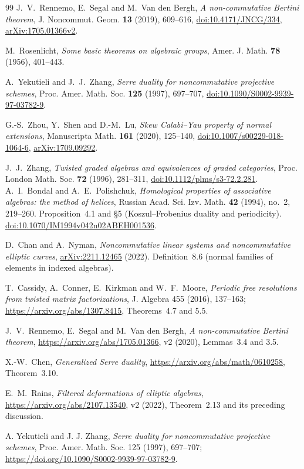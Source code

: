 \documentclass[11pt,a4paper]{ltjsarticle}
\numberwithin{equation}{section}
\begin{document}
\begin{thebibliography}{99}
J.~V.~Rennemo, E.~Segal and M.~Van den Bergh,
\textit{A non-commutative Bertini theorem},
J. Noncommut. Geom. \textbf{13} (2019), 609--616,
\href{https://doi.org/10.4171/JNCG/334}{doi:10.4171/JNCG/334},
\href{https://arxiv.org/abs/1705.01366}{arXiv:1705.01366v2}.

M.~Rosenlicht,
\textit{Some basic theorems on algebraic groups},
Amer. J. Math. \textbf{78} (1956), 401--443.

A.~Yekutieli and J.~J.~Zhang,
\textit{Serre duality for noncommutative projective schemes},
Proc. Amer. Math. Soc. \textbf{125} (1997), 697--707,
\href{https://doi.org/10.1090/S0002-9939-97-03782-9}{doi:10.1090/S0002-9939-97-03782-9}.

G.-S.~Zhou, Y.~Shen and D.-M.~Lu,
\textit{Skew Calabi--Yau property of normal extensions},
Manuscripta Math. \textbf{161} (2020), 125--140,
\href{https://doi.org/10.1007/s00229-018-1064-6}{doi:10.1007/s00229-018-1064-6},
\href{https://arxiv.org/abs/1709.09292}{arXiv:1709.09292}.

J.~J.~Zhang,
\textit{Twisted graded algebras and equivalences of graded categories},
Proc. London Math. Soc. \textbf{72} (1996), 281--311,
\href{https://doi.org/10.1112/plms/s3-72.2.281}{doi:10.1112/plms/s3-72.2.281}.
A.~I.~Bondal and A.~E.~Polishchuk,
\emph{Homological properties of associative algebras: the method of helices},
Russian Acad. Sci. Izv. Math. \textbf{42} (1994), no.~2, 219--260.
Proposition~4.1 and \S5 (Koszul--Frobenius duality and periodicity).
\href{https://doi.org/10.1070/IM1994v042n02ABEH001536}
{doi:10.1070/IM1994v042n02ABEH001536}.

D.~Chan and A.~Nyman,
\emph{Noncommutative linear systems and noncommutative elliptic curves},
\href{https://arxiv.org/abs/2211.12465}{arXiv:2211.12465} (2022).
Definition~8.6 (normal families of elements in indexed algebras).

T.~Cassidy, A.~Conner, E.~Kirkman and W.~F.~Moore,
\emph{Periodic free resolutions from twisted matrix factorizations},
J. Algebra 455 (2016), 137--163;
\url{https://arxiv.org/abs/1307.8415}, Theorems~4.7 and 5.5.

J.~V.~Rennemo, E.~Segal and M.~Van den Bergh,
\emph{A non-commutative Bertini theorem},
\url{https://arxiv.org/abs/1705.01366}, v2 (2020), Lemmas~3.4 and 3.5.

X.-W.~Chen, \emph{Generalized Serre duality},
\url{https://arxiv.org/abs/math/0610258}, Theorem~3.10.

E.~M.~Rains, \emph{Filtered deformations of elliptic algebras},
\url{https://arxiv.org/abs/2107.13540}, v2 (2022), Theorem~2.13 and its preceding discussion.

A. Yekutieli and J. J. Zhang,
\emph{Serre duality for noncommutative projective schemes},
Proc. Amer. Math. Soc. 125 (1997), 697--707;
\url{https://doi.org/10.1090/S0002-9939-97-03782-9}.

\end{thebibliography}
\end{document}
